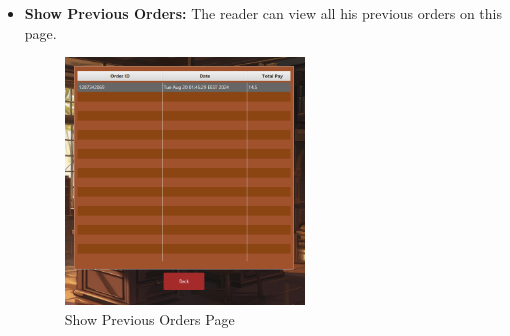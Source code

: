 \documentclass[a4paper,14pt]{extarticle}
\begin{document}
\begin{itemize}
    \item \textbf{Show Previous Orders:} The reader can view all his previous orders on this page.
    \begin{figure}[H]
        \centering
        \includegraphics[width=0.6\textwidth]{Media/Show Previous Orders.png}
        \caption{Show Previous Orders Page}
    \end{figure}
    

\end{itemize}
\end{document}
